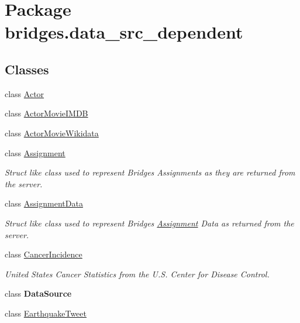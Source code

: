 \hypertarget{namespacebridges_1_1data__src__dependent}{}\section{Package bridges.\+data\+\_\+src\+\_\+dependent}
\label{namespacebridges_1_1data__src__dependent}
\subsection*{Classes}
\begin{DoxyCompactItemize}
\item 
class \hyperlink{classbridges_1_1data__src__dependent_1_1_actor}{Actor}
\item 
class \hyperlink{classbridges_1_1data__src__dependent_1_1_actor_movie_i_m_d_b}{Actor\+Movie\+I\+M\+DB}
\item 
class \hyperlink{classbridges_1_1data__src__dependent_1_1_actor_movie_wikidata}{Actor\+Movie\+Wikidata}
\item 
class \hyperlink{classbridges_1_1data__src__dependent_1_1_assignment}{Assignment}
\begin{DoxyCompactList}\small\item\em Struct like class used to represent Bridges Assignments as they are returned from the server. \end{DoxyCompactList}\item 
class \hyperlink{classbridges_1_1data__src__dependent_1_1_assignment_data}{Assignment\+Data}
\begin{DoxyCompactList}\small\item\em Struct like class used to represent Bridges \hyperlink{classbridges_1_1data__src__dependent_1_1_assignment}{Assignment} Data as returned from the server. \end{DoxyCompactList}\item 
class \hyperlink{classbridges_1_1data__src__dependent_1_1_cancer_incidence}{Cancer\+Incidence}
\begin{DoxyCompactList}\small\item\em United States Cancer Statistics from the U.\+S. Center for Disease Control. \end{DoxyCompactList}\item 
class {\bfseries Data\+Source}
\item 
class \hyperlink{classbridges_1_1data__src__dependent_1_1_earthquake_tweet}{Earthquake\+Tweet}
\item 

\end{DoxyCompactItemize}
